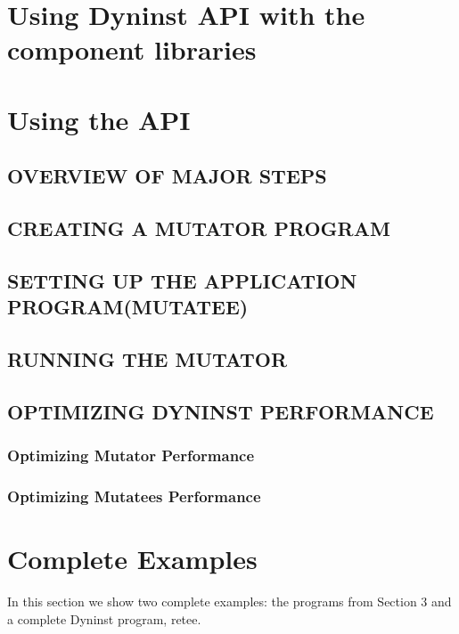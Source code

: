 \documentclass[twopages,a4paper]{article}
\begin{document}
\pagebreak
\tableofcontents

\pagebreak










\section{Using Dyninst API with the component libraries}\label{sec:using_api}
\section{Using the API}
\subsection{OVERVIEW OF MAJOR STEPS}
\subsection{CREATING A MUTATOR PROGRAM}
\subsection{SETTING UP THE APPLICATION PROGRAM(MUTATEE)}
\subsection{RUNNING THE MUTATOR}
\subsection{OPTIMIZING DYNINST PERFORMANCE}
\subsubsection{Optimizing Mutator Performance}
\subsubsection{Optimizing Mutatees Performance}

\appendix
\section{Complete Examples}\label{appdx:complete_examples}
In this section we show two complete examples: the programs from Section 3 and a complete Dyninst program, retee.\\
\end{document}
